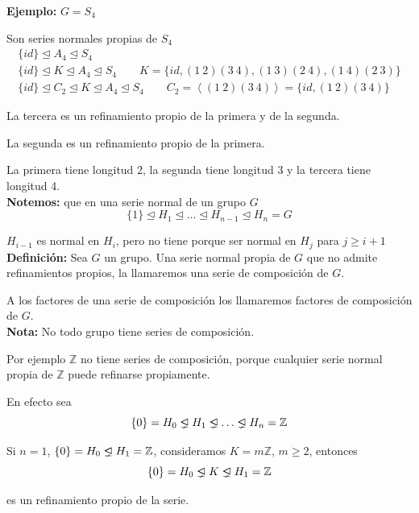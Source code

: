 \documentclass{article}
\newcommand{\unlhdneq}{%
  \mathrel{\ooalign{$\lneq$\cr\raise.22ex\hbox{$\lhd$}\cr}}}
\begin{document}
\textbf{Ejemplo:} $G=S_4$

Son series normales propias de $S_4$
\begin{gather*}
\{id\}\unlhd A_4\unlhd S_4 \\
\{id\}\unlhd K\unlhd A_4\unlhd S_4\qquad K=\{id,(1\:2)(3\:4),(1\:3)(2\:4),(1\:4)(2\:3)\} \\
\{id\}\unlhd C_2\unlhd K\unlhd A_4\unlhd S_4 \qquad C_2=\left\langle (1\:2)(3\:4)\right\rangle =\{id,(1\:2)(3\:4)\}
\end{gather*}

La tercera es un refinamiento propio de la primera y de la segunda.

La segunda es un refinamiento propio de la primera. 

La primera tiene longitud 2, la segunda tiene longitud 3 y la tercera tiene longitud 4. \\

\textbf{Notemos:} que en una serie normal de un grupo $G$
\begin{equation*}
\{1\}\unlhd H_1\unlhd \ldots \unlhd H_{n-1}\unlhd H_n=G
\end{equation*}

$H_{i-1}$ es normal en $H_i$, pero no tiene porque ser normal en $H_j$ para $j\geq i+1$ \\

\textbf{Definición:} Sea $G$ un grupo. Una serie normal propia de $G$ que no admite refinamientos propios, la llamaremos una serie de composición de $G$.

A los factores de una serie de composición los llamaremos factores de composición de $G$. \\

\textbf{Nota:} No todo grupo tiene series de composición.

Por ejemplo $\mathbb{Z}$ no tiene series de composición, porque cualquier serie normal propia de $\mathbb{Z}$ puede refinarse propiamente. 

En efecto sea
\begin{equation*}
\{0\}=H_0\unlhdneq H_1\unlhdneq \ldots \unlhdneq H_n=\mathbb{Z}
\end{equation*}

Si $n=1$, $\{0\}=H_0\unlhdneq H_1=\mathbb{Z}$, consideramos $K=m\mathbb{Z}$, $m\geq 2$, entonces
\begin{equation*}
\{0\}=H_0\unlhdneq K\unlhdneq H_1=\mathbb{Z}
\end{equation*}

es un refinamiento propio de la serie. \\
\end{document}
